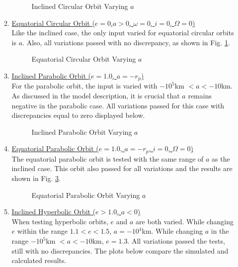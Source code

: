 \begin{itemize}
\begin{enumerate}
\begin{figure}[H]
	\centering
	\caption{Inclined Circular Orbit Varying $a$}
\end{figure}
\item \underline{Equatorial Circular Orbit ($e=0$,\quad $a>0$, \quad $\omega=0$, \quad $i=0$, \quad $\Omega=0$)}\\
Like the inclined case, the only input varied for equatorial circular orbits is $a$. Also, all variations passed with no discrepancy, as shown in Fig. \ref{fig:7}.
\begin{figure}[H]
	\centering
	\caption{Equatorial Circular Orbit Varying $a$}\label{fig:7}
\end{figure}
		\pagebreak
		\item \underline{Inclined Parabolic Orbit ($e=1.0$, \quad $a=-r_p$)}\\
		For the parabolic orbit, the input is varied with $-10^5$km $<a < -10$km. As discussed in the model description, it is crucial that $a$ remains negative in the parabolic case. All variations passed for this case with discrepancies equal to zero displayed below.
		\begin{figure}[H] \label{fig:8}
	\centering
	\caption{Inclined Parabolic Orbit Varying $a$}
\end{figure}
\item \underline{Equatorial Parabolic Orbit ($e=1.0$, \quad $a=-r_p$, \quad $i=0$, \quad $\Omega=0$)}\\
The equatorial parabolic orbit is tested with the same range of $a$ as the inclined case. This orbit also passed for all variations and the results are shown in Fig. \ref{fig:9}.
\begin{figure}[H]
	\centering
	\caption{Equatorial Parabolic Orbit Varying $a$}\label{fig:9}
\end{figure}
		\pagebreak
		\item \underline{Inclined Hyperbolic Orbit ($e>1.0$, \quad $a<0$)}\\
		When testing hyperbolic orbits, $e$ and $a$ are both varied. While changing $e$ within the range $1.1<e<1.5$, $a=-10^4$km. While changing $a$ in the range $-10^5$km $<a < -10$km, $e=1.3$. All variations passed the tests, still with no discrepancies. The plots below compare the simulated and calculated results.

\end{enumerate}
\end{itemize}
